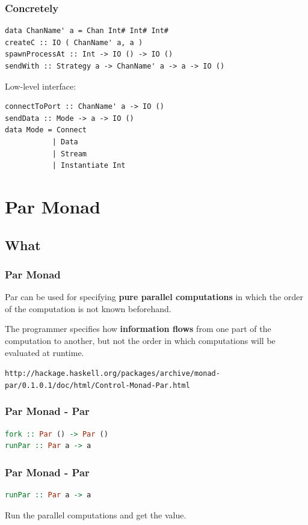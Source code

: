 \documentclass[12pt, danish]{beamer}
\begin{document}
\begin{frame}[fragile]
\frametitle{Concretely}

\begin{verbatim}
data ChanName' a = Chan Int# Int# Int#
createC :: IO ( ChanName' a, a )
spawnProcessAt :: Int -> IO () -> IO ()
sendWith :: Strategy a -> ChanName' a -> a -> IO ()
\end{verbatim}
\pause
Low-level interface:
\begin{verbatim}
connectToPort :: ChanName' a -> IO ()
sendData :: Mode -> a -> IO ()
data Mode = Connect
           | Data
           | Stream
           | Instantiate Int
\end{verbatim}

\end{frame}

\section{Par Monad}

\subsection{What}

\begin{frame}
  \frametitle{Par Monad}
  Par can be used for specifying \textbf{pure parallel computations} in which the order of the computation is not known beforehand. \newline
  
  The programmer specifies how \textbf{information flows} from one part of the computation to another, but not the order in which computations will be evaluated at runtime.\newline
  
  \tiny{\texttt{http://hackage.haskell.org/packages/archive/monad-par/0.1.0.1/doc/html/Control-Monad-Par.html}}
\end{frame}

\begin{frame}[fragile]
  \frametitle{Par Monad - Par}
  \begin{lstlisting}[language=Haskell]
fork :: Par () -> Par ()
runPar :: Par a -> a
  \end{lstlisting}
\end{frame}

\begin{frame}[fragile]
  \frametitle{Par Monad - Par}
  \begin{lstlisting}[language=Haskell]
runPar :: Par a -> a
  \end{lstlisting}

  Run the parallel computations and get the value.
\end{frame}
\end{document}
